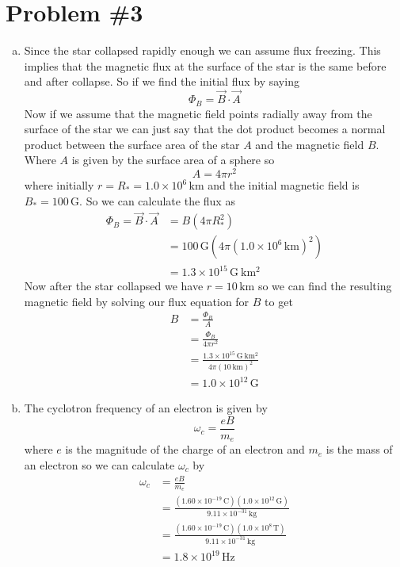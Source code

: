 \documentclass[11pt]{article}
\numberwithin{equation}{section}
\newcommand{\unit}[1]{\ensuremath{\, \mathrm{#1}}}
\begin{document}
\section{Problem \#3}
\begin{enumerate}[(a)]
\item 
Since the star collapsed rapidly enough we can assume flux freezing. This implies that the magnetic flux at the surface of the star is the same before and after collapse. So if we find the initial flux by saying
$$\Phi_B = \vec{B}\cdot\vec{A}$$
Now if we assume that the magnetic field points radially away from the surface of the star we can just say that the dot product becomes a normal product between the surface area of the star $A$ and the magnetic field $B$. Where $A$ is given by the surface area of a sphere so 
$$A = 4\pi r^2$$
where initially $r = R_* =1.0\times10^{6}\unit{km}$ and the initial magnetic field is $B_* = 100\unit{G}$. So we can calculate the flux as
\begin{align*}
\Phi_B = \vec{B}\cdot\vec{A} &= B(4\pi R_*^2)\\
&= 100\unit{G}(4\pi(1.0\times10^{6}\unit{km})^2)\\
&=1.3\times10^{15}\unit{G\ km^2}
\end{align*}
Now after the star collapsed we have $r = 10\unit{km}$ so we can find the resulting magnetic field by solving our flux equation for $B$ to get
\begin{align*}
B &= \frac{\Phi_B}{A}\\
&= \frac{\Phi_B}{4\pi r^2}\\
&= \frac{1.3\times10^{15}\unit{G\ km^2}}{4\pi (10\unit{km})^2}\\
&= 1.0\times10^{12}\unit{G}
\end{align*}

\item
The cyclotron frequency of an electron is given by
$$\omega_c = \frac{eB}{m_e}$$
where $e$ is the magnitude of the charge of an electron and $m_e$ is the mass of an electron so we can calculate $\omega_c$ by
\begin{align*}
\omega_c &= \frac{eB}{m_e}\\
&= \frac{(1.60\times10^{-19}\unit{C})(1.0\times10^{12}\unit{G})}{9.11\times10^{-31}\unit{kg}}\\
&= \frac{(1.60\times10^{-19}\unit{C})(1.0\times10^{8}\unit{T})}{9.11\times10^{-31}\unit{kg}}\\
&= 1.8\times10^{19}\unit{Hz}
\end{align*}

\end{enumerate}
\end{document}
